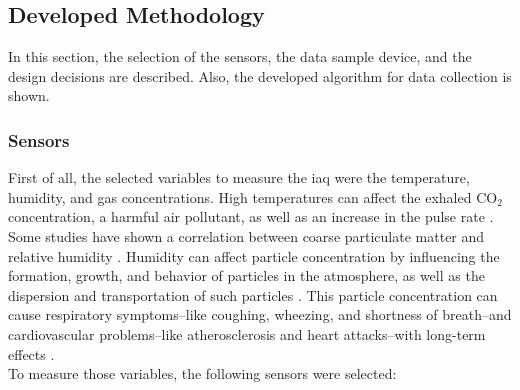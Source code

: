 \subsection{Developed Methodology}
\label{sec:methodology:dev_methodology}
\hspace{8pt}
In this section, the selection of the sensors, the data sample device, and the design decisions are described. Also, the developed algorithm for data collection is shown.


\subsubsection{Sensors}
\label{sec:methodology:dev_methodology:sensors}
\hspace{8pt}
First of all, the selected variables to measure the \acrshort{iaq} were the temperature, humidity, and gas concentrations. High temperatures can affect the exhaled CO$_{2}$ concentration, a harmful air pollutant, as well as an increase in the pulse rate \cite{en14238127}. Some studies have shown a correlation between coarse particulate matter and relative humidity \cite{yang_2020, tanatachalert_2023, xing_2016}. Humidity can affect particle concentration by influencing the formation, growth, and behavior of particles in the atmosphere, as well as the dispersion and transportation of such particles \cite{tanatachalert_2023}. This particle concentration can cause respiratory symptoms--like coughing, wheezing, and shortness of breath--and cardiovascular problems--like atherosclerosis and heart attacks--with long-term effects \cite{ahamed_2022, ding_2021, tang_2021}. \\

To measure those variables, the following sensors were selected:


